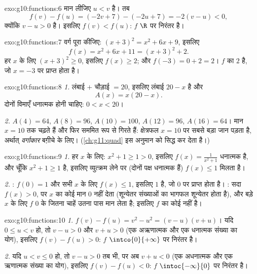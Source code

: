 \begin{solution}{exo:g10:functions:6}
मान लीजिए $u < v$ है। तब
\[
f(v) - f(u) = (-2v + 7) - (-2u + 7) = -2(v - u) < 0,
\]
क्योंकि $v - u > 0$ है। इसलिए $f(v) < f(u)$: $f$ $\R$ पर निरंतर  है।
\end{solution}

\begin{solution}{exo:g10:functions:7}
वर्ग पूरा कीजिए: $(x+3)^2 = x^2 + 6x + 9$, इसलिए
\[
f(x) = x^2 + 6x + 11 = (x + 3)^2 + 2 .
\]
हर $x$ के लिए $(x+3)^2 \geq 0$, इसलिए $f(x) \geq 2$; और $f(-3) = 0 + 2 = 2$। $f$ का  $2$ है, जो $x = -3$
पर प्राप्त होता है।
\end{solution}

\begin{solution}{exo:g10:functions:8}
\emph{1.} लंबाई $+$ चौड़ाई $= 20$, इसलिए लंबाई $20 - x$ है और
\[
A(x) = x(20 - x).
\]
दोनों विमाएँ धनात्मक होनी चाहिए: $0 < x < 20$।

\emph{2.} $A(4) = 64$, $A(8) = 96$, $A(10) = 100$, $A(12) = 96$, $A(16) = 64$। मान $x = 10$ तक चढ़ते हैं और फिर सममित
रूप से गिरते हैं: क्षेत्रफल $x = 10$ पर सबसे बड़ा जान पड़ता है, अर्थात्
\emph{वर्गाकार} बग़ीचे के लिए। (\cref{ch:g11:quad} इस अनुमान को सिद्ध कर देता है।)
\end{solution}

\begin{solution}{exo:g10:functions:9}
\emph{1.} हर $x$ के लिए: $x^2 + 1 \geq 1 > 0$, इसलिए $f(x) = \frac{1}{x^2+1}$ धनात्मक है, और चूँकि $x^2 + 1 \geq 1$ है,
इसलिए व्युत्क्रम लेने पर (दोनों पक्ष धनात्मक हैं) $f(x) \leq 1$ मिलता है।

\emph{2.} : $f(0) = 1$ और सभी $x$ के लिए $f(x) \leq 1$, इसलिए $1$  है, जो
$0$ पर प्राप्त होता है। : सदा $f(x) > 0$, पर $x$ का कोई मान $0$ नहीं
देता (शून्येतर संख्याओं का भागफल शून्येतर होता है), और बड़े $x$ के लिए
$f$ $0$ के जितना चाहें उतना पास मान लेता है; इसलिए $f$ का कोई 
नहीं है।
\end{solution}

\begin{solution}{exo:g10:functions:10}
\emph{1.} $f(v) - f(u) = v^2 - u^2 = (v-u)(v+u)$। यदि $0 \leq u < v$ हो, तो $v - u > 0$ और $v + u > 0$ (एक अऋणात्मक और एक धनात्मक
संख्या का योग), इसलिए $f(v) - f(u) > 0$: $f$ $\intco{0}{+\infty}$ पर निरंतर  है।

\emph{2.} यदि $u < v \leq 0$ हो, तो $v - u > 0$ तब भी, पर अब $v + u < 0$ (एक अधनात्मक और एक
ऋणात्मक संख्या का योग), इसलिए $f(v) - f(u) < 0$: $f$ $\intoc{-\infty}{0}$ पर निरंतर  है।
\end{solution}


